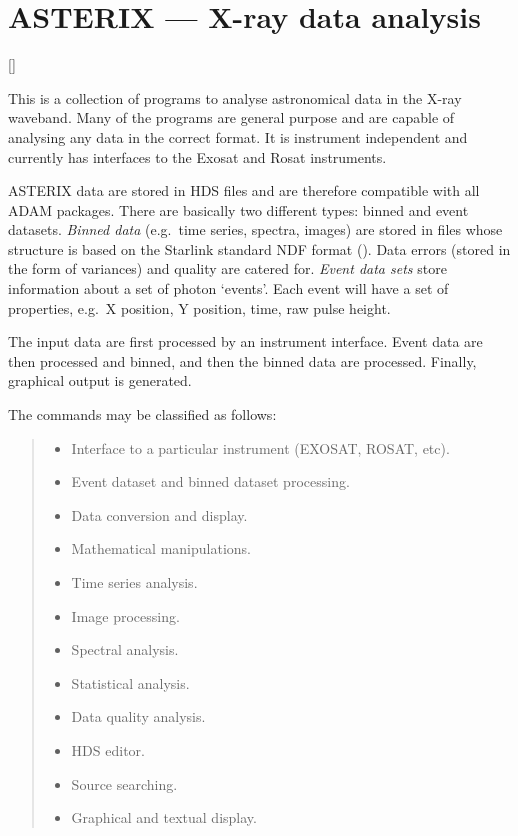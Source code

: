 \newpage

\section{ASTERIX --- X-ray data analysis}

\vspace{-11mm}

\hfill []

\vspace{5mm}

This is a collection of programs to analyse astronomical data in the X-ray
waveband.
Many of the programs are general purpose and are capable of analysing any data
in the correct format.
It is instrument independent and currently has interfaces to the Exosat and
Rosat instruments.

ASTERIX data are stored in HDS files and are therefore compatible with all ADAM
packages.
There are basically two different types: binned and event datasets.
{\em Binned data} (e.g.\ time series, spectra, images) are stored in files whose
structure is based on the Starlink standard NDF format
().
Data errors (stored in the form of variances) and quality are catered for.
{\em Event data sets} store information about a set of photon `events'.
Each event will have a set of properties, e.g.\ X position, Y position, time,
raw pulse height.

The input data are first processed by an instrument interface.
Event data are then processed and binned, and then the binned data are
processed.
Finally, graphical output is generated.

The commands may be classified as follows:
{\small
\begin{quote}
\begin{itemize}
\item Interface to a particular instrument (EXOSAT, ROSAT, etc).
\item Event dataset and binned dataset processing.
\item Data conversion and display.
\item Mathematical manipulations.
\item Time series analysis.
\item Image processing.
\item Spectral analysis.
\item Statistical analysis.
\item Data quality analysis.
\item HDS editor.
\item Source searching.
\item Graphical and textual display.
\end{itemize}
\end{quote}
}

